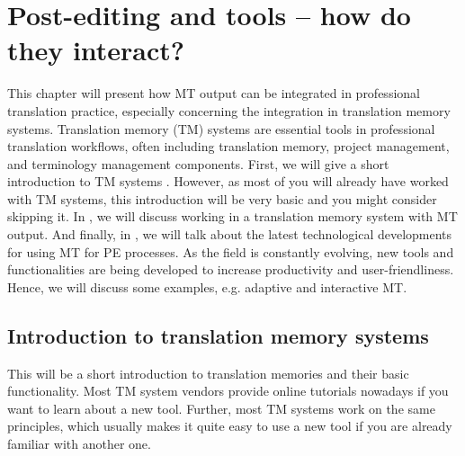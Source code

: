 \chapter{Post-editing and tools -- how do they interact?}\label{sec:6}



\vspace{\baselineskip}

This chapter will present how MT output can be integrated in professional translation practice, especially concerning the integration in translation memory systems. Translation memory (TM) systems are essential tools in professional translation workflows, often including translation memory, project management, and terminology management components. First, we will give a short introduction to TM systems . However, as most of you will already have worked with TM systems, this introduction will be very basic and you might consider skipping it. In , we will discuss working in a translation memory system with MT output. And finally, in , we will talk about the latest technological developments for using MT for PE processes. As the field is constantly evolving, new tools and functionalities are being developed to increase productivity and user-friendliness. Hence, we will discuss some examples, e.g. adaptive and interactive MT.

\section{Introduction to translation memory systems}\label{sec:6:1}

This will be a short introduction to translation memories and their basic functionality. Most TM system vendors provide online tutorials nowadays if you want to learn about a new tool. Further, most TM systems work on the same principles, which usually makes it quite easy to use a new tool if you are already familiar with another one.

